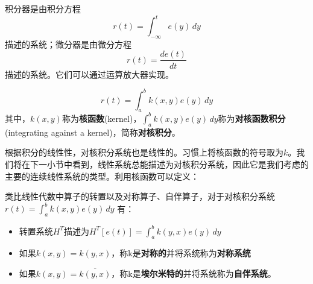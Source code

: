 \begin{example}[微分器与积分器]
    积分器是由积分方程$$r(t)=\int_{-\infty}^{t}e(y)\,dy$$描述的系统；微分器是由微分方程$$r(t)=\frac{de(t)}{dt}$$描述的系统。它们可以通过运算放大器实现。
\end{example}

\begin{example}[对核积分]
\begin{equation*}
    r(t)=\int_{a}^{b}k(x,y)e(y)\,dy
\end{equation*}
其中，$k(x,y)$称为\textbf{核函数}(kernel)，$\int_{a}^{b}k(x,y)e(y)\,dy$称为\textbf{对核函数积分}(integrating against a kernel)，简称\textbf{对核积分}。
\end{example}
根据积分的线性性，对核积分系统也是线性的。习惯上将核函数的符号取为$k$。我们将在下一小节中看到，线性系统总能描述为对核积分系统，因此它是我们考虑的主要的连续线性系统的类型。利用核函数可以定义：

\begin{definition}[转置系统对称系统与自伴系统]
    类比线性代数中算子的转置以及对称算子、自伴算子，对于对核积分系统
    $r(t)=\int_{a}^{b}k(x,y)e(y)\,dy$
    有：
\begin{itemize}
    \item 转置系统$H^T$描述为$H^T[e(t)]=\int_{a}^{b}k(y,x)e(y)\,dy$
    \item 如果$k(x,y)=k(y,x)$，称k是\textbf{对称的}并将系统称为\textbf{对称系统}
    \item 如果$k(x,y)=\overline{k(y,x)}$，称k是\textbf{埃尔米特的}并将系统称为\textbf{自伴系统}。
\end{itemize}
\end{definition}


